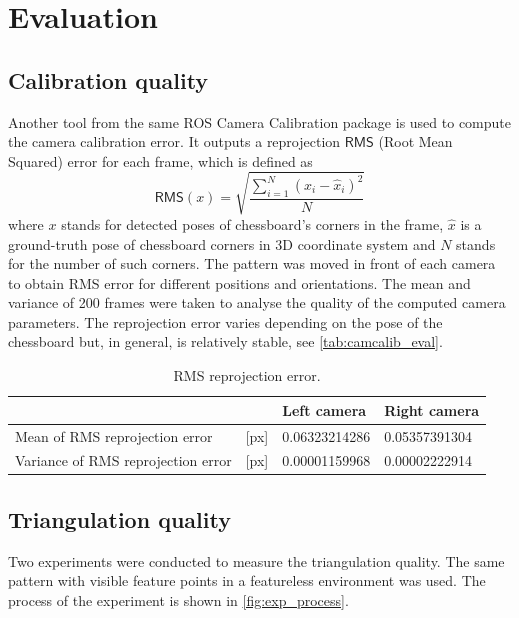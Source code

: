 \chapter{Evaluation}
\label{chapter:evaluation}

\section{Calibration quality}
Another tool from the same ROS Camera Calibration package is used to compute the camera calibration error.
It outputs a reprojection $\mathsf{RMS}$ (Root Mean Squared) error for each frame, which is defined as
\begin{equation}
    \mathsf{RMS}(x) = \sqrt{\frac{\sum_{i=1}^{N}{(x_i - \hat{x}_i)^2}}{N}}
\end{equation}
where $x$ stands for detected poses of chessboard's corners in the frame, $\hat{x}$ is a ground-truth pose of chessboard corners in 3D coordinate system and $N$ stands for the number of such corners.
The pattern was moved in front of each camera to obtain RMS error for different positions and orientations.
The mean and variance of 200 frames were taken to analyse the quality of the computed camera parameters. 
The reprojection error varies depending on the pose of the chessboard but, in general, is relatively stable, see \autoref{tab:camcalib_eval}.

\begin{table}[ht]
    \begin{center}
      \begin{tabular}{ ll l l }
      \hline
      && Left camera & Right camera \\ \hline
      Mean of RMS reprojection error & [px] & 0.06323214286 & 0.05357391304 \\
      Variance of RMS reprojection error & [px] & 0.00001159968 & 0.00002222914 \\
      \end{tabular}
    \end{center}
    \caption{RMS reprojection error.}
    \label{tab:camcalib_eval}
\end{table}

\section{Triangulation quality}
Two experiments were conducted to measure the triangulation quality.
The same pattern with visible feature points in a featureless environment was used.
The process of the experiment is shown in \autoref{fig:exp_process}.

